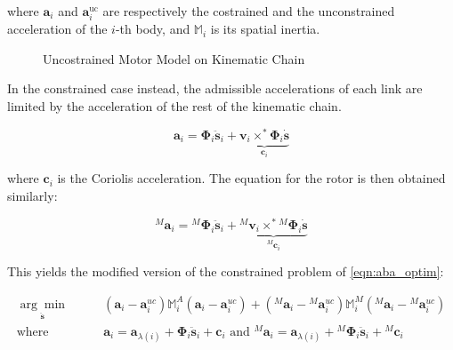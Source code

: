 where $\mathbf{a} _i$ and $\mathbf{a} _i ^{\text{uc}}$ are respectively the costrained and the unconstrained acceleration of the $i$-th body, and $\mathbb{M}_i$ is its spatial inertia.


\begin{figure}
    \centering
    \caption{Uncostrained Motor Model on Kinematic Chain}
    \label{fig:disassembled_motor}
    \resizebox{0.8\textwidth}{!}{
        
    }
\end{figure}

In the constrained case instead, the admissible accelerations of each link are limited by the acceleration of the rest of the kinematic chain.

\begin{equation}
    \mathbf{a} _i = \boldsymbol{\Phi} _i \ddot{\mathbf{s}} _i + \underbrace{\mathbf{v} _i \times ^* \boldsymbol{\Phi} _i \dot{\mathbf{s}}} _{\mathbf{c} _i}
\end{equation}

where $\mathbf{c} _i$ is the Coriolis acceleration. The equation for the rotor is then obtained similarly:

\begin{equation}
    {} ^M \mathbf{a} _i = {} ^M \boldsymbol{\Phi} _i \ddot{\mathbf{s}} _i + \underbrace{{} ^M \mathbf{v} _i \times ^* {} ^M\boldsymbol{\Phi} _i \dot{\mathbf{s}}} _{{} ^M \mathbf{c} _i}
\end{equation}

This yields the modified version of the constrained problem of \cref{eqn:aba_optim}:

\begin{align}
    \underset{\ddot{\mathbf{s}}}{\arg \min} & \qquad (\mathbf{a} _i - \mathbf{a} _i ^{uc}) \mathbb{M} ^A _i (\mathbf{a} _i - \mathbf{a} _i ^{uc}) + ({} ^M \mathbf{a} _i - {} ^M \mathbf{a} _i ^{uc}) \mathbb{M} ^M _i ({} ^M \mathbf{a} _i - {} ^M \mathbf{a} _i ^{uc}) \nonumber                         \\
    \text{where }                           & \qquad \mathbf{a} _i = \mathbf{a} _{\lambda (i)} + \boldsymbol{\Phi} _i \ddot{\mathbf{s}} _i + \mathbf{c} _i \text{ and } {} ^M \mathbf{a} _i = \mathbf{a} _{\lambda (i)} + {} ^M  \boldsymbol{\Phi} _i \ddot{\mathbf{s}} _i + {} ^M \mathbf{c} _i \nonumber \\
\end{align}

